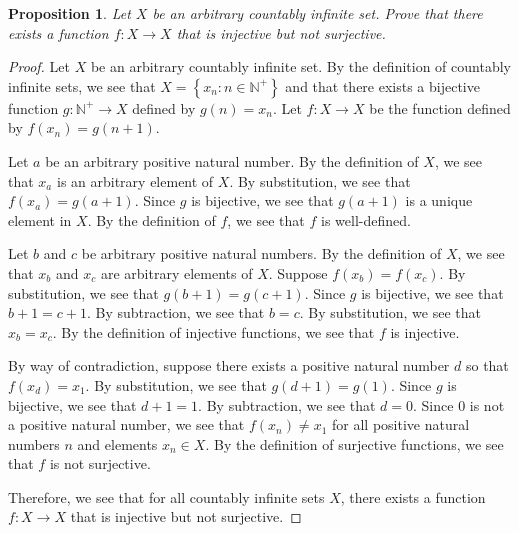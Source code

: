 \documentclass{amsart}
\newtheorem*{proposition}{Proposition}
\newcommand{\set}[1]{\left\{#1\right\}}
\newcommand{\N}{\mathbb{N}}
\numberwithin{equation}{section}
\begin{document}
	\begin{problem}[manual-num=67]
		\begin{proposition}
			Let $X$ be an arbitrary countably infinite set.
			Prove that there exists a function $f : X \rightarrow X$  that is injective but not surjective.
		\end{proposition}

		\begin{proof}
			Let $X$ be an arbitrary countably infinite set.
			By the definition of countably infinite sets, we see that $X = \set{x_n : n \in \N^+}$ and that there exists a bijective function $g : \N^+ \rightarrow X$ defined by $g(n) = x_n$.
			Let $f : X \rightarrow X$ be the function defined by $f(x_n) = g(n + 1)$.

			Let $a$ be an arbitrary positive natural number.
			By the definition of $X$, we see that $x_a$ is an arbitrary element of $X$.
			By substitution, we see that $f(x_a) = g(a + 1)$.
			Since $g$ is bijective, we see that $g(a + 1)$ is a unique element in $X$.
			By the definition of $f$, we see that $f$ is well-defined.

			Let $b$ and $c$ be arbitrary positive natural numbers.
			By the definition of $X$, we see that $x_b$ and $x_c$ are arbitrary elements of $X$.
			Suppose $f(x_b) = f(x_c)$.
			By substitution, we see that $g(b + 1) = g(c + 1)$.
			Since $g$ is bijective, we see that $b + 1 = c + 1$.
			By subtraction, we see that $b = c$.
			By substitution, we see that $x_b = x_c$.
			By the definition of injective functions, we see that $f$ is injective.

			By way of contradiction, suppose there exists a positive natural number $d$ so that $f(x_d) = x_1$.
			By substitution, we see that $g(d + 1) = g(1)$.
			Since $g$ is bijective, we see that $d + 1 = 1$.
			By subtraction, we see that $d = 0$.
			Since $0$ is not a positive natural number, we see that $f(x_n) \neq x_1$ for all positive natural numbers $n$ and elements $x_n \in X$.
			By the definition of surjective functions, we see that $f$ is not surjective.

			Therefore, we see that for all countably infinite sets $X$, there exists a function $f : X \rightarrow X$ that is injective but not surjective.
		\end{proof}
	\end{problem}
\end{document}
